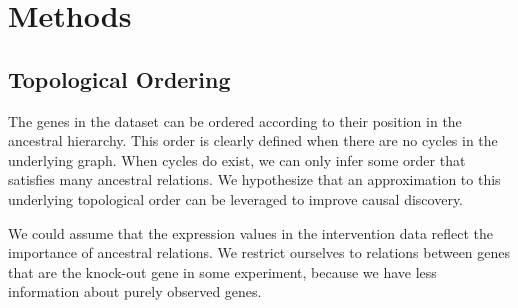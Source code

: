 \section*{Methods}


\subsection*{Topological Ordering}
The genes in the dataset can be ordered according to their position in the ancestral hierarchy. This order is clearly defined when there are no cycles in the underlying graph. When cycles do exist, we can only infer some order that satisfies many ancestral relations. We hypothesize that an approximation to this underlying topological order can be leveraged to improve causal discovery.

We could assume that the expression values in the intervention data reflect the importance of ancestral relations. We restrict ourselves to relations between genes that are the knock-out gene in some experiment, because we have less information about purely observed genes. 

